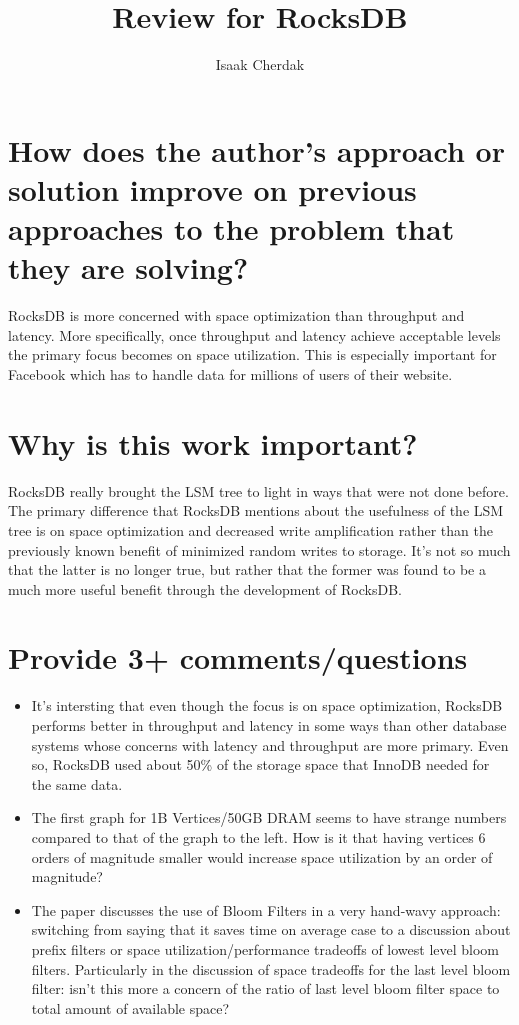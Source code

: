 \documentclass{article}
\title{Review for RocksDB}
\author{Isaak Cherdak}
\begin{document}
\maketitle

\section{How does the author's approach or solution improve on previous
approaches to the problem that they are solving?}

RocksDB is more concerned with space optimization than throughput and latency.
More specifically, once throughput and latency achieve acceptable levels the
primary focus becomes on space utilization. This is especially important for
Facebook which has to handle data for millions of users of their website.

\section{Why is this work important?}

RocksDB really brought the LSM tree to light in ways that were not done before.
The primary difference that RocksDB mentions about the usefulness of the LSM
tree is on space optimization and decreased write amplification rather than the
previously known benefit of minimized random writes to storage. It's not so much
that the latter is no longer true, but rather that the former was found to be a
much more useful benefit through the development of RocksDB.

\section{Provide 3+ comments/questions}

\begin{itemize}
  \item It's intersting that even though the focus is on space optimization,
    RocksDB performs better in throughput and latency in some ways than other
    database systems whose concerns with latency and throughput are more
    primary. Even so, RocksDB used about 50\% of the storage space that InnoDB
    needed for the same data.
  \item The first graph for 1B Vertices/50GB DRAM seems to have strange numbers
    compared to that of the graph to the left. How is it that having vertices 6
    orders of magnitude smaller would increase space utilization by an order of
    magnitude?
  \item The paper discusses the use of Bloom Filters in a very hand-wavy
    approach: switching from saying that it saves time on average case to a
    discussion about prefix filters or space utilization/performance tradeoffs
    of lowest level bloom filters. Particularly in the discussion of space
    tradeoffs for the last level bloom filter: isn't this more a concern of the
    ratio of last level bloom filter space to total amount of available space?
\end{itemize}
\end{document}
